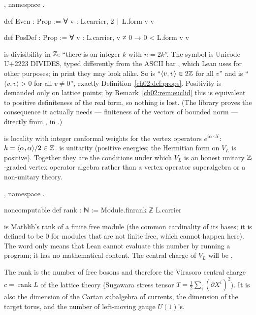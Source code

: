 \begin{definition}\label{ch02:def:voaevenposdef}
, namespace .
\end{definition}
\begin{leancode}
def Even : Prop := ∀ v : L.carrier, 2 ∣ L.form v v

def PosDef : Prop := ∀ v : L.carrier, v ≠ 0 → 0 < L.form v v
\end{leancode}
\begin{dictionary}
 is divisibility in ${\mathbb{Z}}$: ``there is an integer $k$ with $n=2k$''.  The symbol
 is Unicode U+2223 DIVIDES, typed differently from the ASCII bar \lean{|}, which Lean uses
for other purposes; in print they may look alike.
So  is ``$\langle v,v\rangle\in2{\mathbb{Z}}$ for all $v$'' and  is ``$\langle
v,v\rangle>0$ for all $v\neq0$'', exactly Definition~\ref{ch02:def:props}.  Positivity is
demanded only on lattice points; by Remark~\ref{ch02:rem:euclid} this is equivalent to positive
definiteness of the real form, so nothing is lost.  (The library proves the consequence it
actually needs --- finiteness of the vectors of bounded norm --- directly from , in
.)
\end{dictionary}
\begin{physics}
 is locality with integer conformal weights for the vertex operators $e^{i\alpha\cdot X}$: $h=\langle\alpha,\alpha\rangle/2\in{\mathbb{Z}}$.  is unitarity (positive energies; the Hermitian form on $V_L$ is positive). Together they are the conditions under which $V_L$ is an honest unitary ${\mathbb{Z}}$-graded vertex operator algebra rather than a vertex operator superalgebra or a non-unitary theory.
\end{physics}

\begin{definition}\label{ch02:def:voarank}
, namespace .
\end{definition}
\begin{leancode}
noncomputable def rank : ℕ := Module.finrank ℤ L.carrier
\end{leancode}
\begin{dictionary}
 is Mathlib's rank of a finite free module (the common cardinality of
its bases; it is defined to be $0$ for modules that are not finite free, which cannot happen
here).  The word  only means that Lean cannot evaluate this number by running
a program; it has no mathematical content.  The central charge of $V_L$ will be .
\end{dictionary}
\begin{physics}
The rank is the number of free bosons and therefore the Virasoro central charge $c=\operatorname{rank}L$ of the lattice theory (Sugawara stress tensor $T=\tfrac12\sum_i(\partial X^i)^2$). It is also the dimension of the Cartan subalgebra of currents, the dimension of the target torus, and the number of left-moving gauge $U(1)$'s.
\end{physics}

